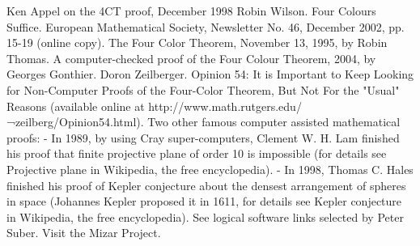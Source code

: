Ken Appel on the 4CT proof, December 1998
Robin Wilson. Four Colours Suffice. European Mathematical Society, Newsletter No. 46, December 2002, pp. 15-19 (online
copy).
The Four Color Theorem, November 13, 1995, by Robin Thomas.
A computer-checked proof of the Four Colour Theorem, 2004, by Georges Gonthier.
Doron Zeilberger. Opinion 54: It is Important to Keep Looking for Non-Computer Proofs of the Four-Color Theorem, But Not
For the "Usual" Reasons (available online at http://www.math.rutgers.edu/¬zeilberg/Opinion54.html).
Two other famous computer assisted mathematical proofs:
- In 1989, by using Cray super-computers, Clement W. H. Lam finished his proof that finite projective plane of order 10 is
impossible (for details see Projective plane in Wikipedia, the free encyclopedia).
- In 1998, Thomas C. Hales finished his proof of Kepler conjecture about the densest arrangement of spheres in space
(Johannes Kepler proposed it in 1611, for details see Kepler conjecture in Wikipedia, the free encyclopedia).
See logical software links selected by Peter Suber.
Visit the Mizar Project.
